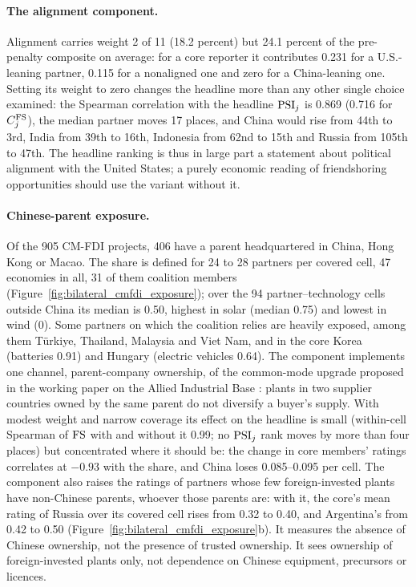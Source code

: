 \paragraph{The alignment component.} Alignment carries weight 2 of 11 (18.2 percent) but 24.1
percent of the pre-penalty composite on average: for a core reporter it contributes 0.231 for a
U.S.-leaning partner, 0.115 for a nonaligned one and zero for a China-leaning one. Setting its weight
to zero changes the headline more than any other single choice examined: the Spearman correlation
with the headline $\mathrm{PSI}_j$ is 0.869 (0.716 for $C^{\mathrm{FS}}_j$), the median partner moves 17 places, and
China would rise from 44th to 3rd, India from 39th to 16th, Indonesia from 62nd to 15th and Russia
from 105th to 47th. The headline ranking is thus in large part a statement about political alignment
with the United States; a purely economic reading of friendshoring opportunities should use the
variant without it.

\paragraph{Chinese-parent exposure.} Of the 905 CM-FDI projects, 406 have a parent headquartered in
China, Hong Kong or Macao. The share is defined for 24 to 28 partners per covered cell, 47 economies
in all, 31 of them coalition members (Figure~\ref{fig:bilateral_cmfdi_exposure}); over the 94
partner--technology cells outside China its median is 0.50, highest in solar (median 0.75) and
lowest in wind (0). Some partners on which the coalition relies are heavily exposed, among them
T\"urkiye, Thailand, Malaysia and Viet Nam, and in the core Korea (batteries 0.91) and Hungary
(electric vehicles 0.64). The component implements one channel, parent-company ownership, of the
common-mode upgrade proposed in the working paper on the Allied Industrial Base
\citep{neis2026allied}: plants in two supplier countries owned by
the same parent do not diversify a buyer's supply. With modest weight and narrow coverage its effect
on the headline is small (within-cell Spearman of $\mathrm{FS}$ with and without it 0.99; no $\mathrm{PSI}_j$ rank
moves by more than four places) but concentrated where it should be: the change in core members'
ratings correlates at $-0.93$ with the share, and China loses 0.085--0.095 per cell. The component
also raises the ratings of partners whose few foreign-invested plants have non-Chinese parents,
whoever those parents are: with it, the core's mean rating of Russia over its covered cell rises
from 0.32 to 0.40, and Argentina's from 0.42 to 0.50
(Figure~\ref{fig:bilateral_cmfdi_exposure}b). It measures the absence of Chinese ownership, not the
presence of trusted ownership. It sees
ownership of foreign-invested plants only, not dependence on Chinese equipment, precursors or
licences.

